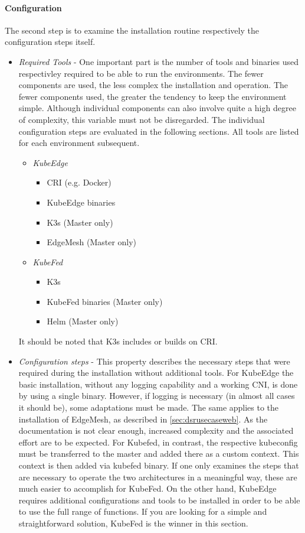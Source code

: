 \documentclass[MSC,Master,english]{twbook}%
\begin{document}
\paragraph{Configuration} The second step is to examine the installation routine respectively the configuration steps itself.
\begin{itemize}
    \item \textit{Required Tools} - One important part is the number of tools and binaries used respectivley required to be able to run the environments. The fewer components are used, the less complex the installation and operation. The fewer components used, the greater the tendency to keep the environment simple. Although individual components can also involve quite a high degree of complexity, this variable must not be disregarded. The individual configuration steps are evaluated in the following sections. All tools are listed for each environment subsequent.
    \begin{itemize} 
        \item \textit{KubeEdge}
        \begin{itemize}
            \item \ac{CRI} (e.g. Docker)
            \item KubeEdge binaries
            \item K3s (Master only)
            \item EdgeMesh (Master only)
        \end{itemize}
        \item \textit{KubeFed}
        \begin{itemize}
            \item K3s
            \item KubeFed binaries (Master only)
            \item Helm (Master only)
        \end{itemize}
    \end{itemize}
    It should be noted that K3s includes or builds on \ac{CRI}. 
    \item \textit{Configuration steps} - This property describes the necessary steps that were required during the installation without additional tools. For KubeEdge the basic installation, without any logging capability and a working \ac{CNI}, is done by using a single binary. However, if logging is necessary (in almost all cases it should be), some adaptations must be made. The same applies to the installation of EdgeMesh, as described in \autoref{sec:dsrusecaseweb}. As the documentation is not clear enough, increased complexity and the associated effort are to be expected. For Kubefed, in contrast, the respective kubeconfig must be transferred to the master and added there as a custom context. This context is then added via kubefed binary. If one only examines the steps that are necessary to operate the two architectures in a meaningful way, these are much easier to accomplish for KubeFed. On the other hand, KubeEdge requires additional configurations and tools to be installed in order to be able to use the full range of functions. If you are looking for a simple and straightforward solution, KubeFed is the  winner in this section.

\end{itemize}
\end{document}

